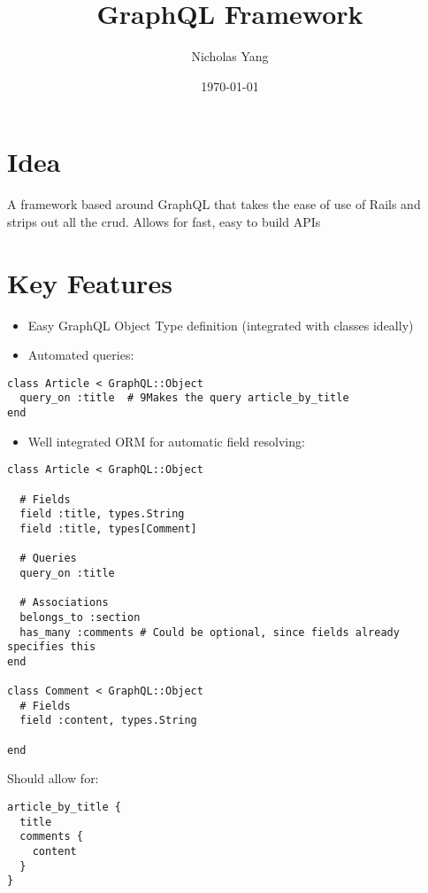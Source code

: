 \documentclass[11pt]{article}
\author{Nicholas Yang}
\date{\today}
\title{GraphQL Framework}
\begin{document}
\maketitle
\tableofcontents


\section{Idea}
\label{sec-1}
A framework based around GraphQL that takes the ease of use of Rails
and strips out all the crud. Allows for fast, easy to build APIs

\section{Key Features}
\label{sec-2}
\begin{itemize}
\item Easy GraphQL Object Type definition (integrated with classes ideally)
\item Automated queries:
\end{itemize}

\begin{verbatim}
class Article < GraphQL::Object
  query_on :title  # 9Makes the query article_by_title
end
\end{verbatim}

\begin{itemize}
\item Well integrated ORM for automatic field resolving:
\end{itemize}

\begin{verbatim}
class Article < GraphQL::Object

  # Fields
  field :title, types.String
  field :title, types[Comment]

  # Queries
  query_on :title

  # Associations
  belongs_to :section
  has_many :comments # Could be optional, since fields already specifies this
end

class Comment < GraphQL::Object  
  # Fields
  field :content, types.String

end
\end{verbatim}

Should allow for:

\begin{verbatim}
article_by_title {
  title
  comments {
    content
  }
}
\end{verbatim}
\end{document}
